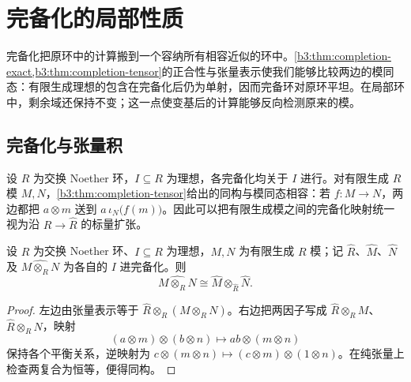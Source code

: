 
\section{完备化的局部性质}
\label{b3:sec:1304}


完备化把原环中的计算搬到一个容纳所有相容近似的环中。\cref{b3:thm:completion-exact,b3:thm:completion-tensor}的正合性与张量表示使我们能够比较两边的模同态：有限生成理想的包含在完备化后仍为单射，因而完备环对原环平坦。在局部环中，剩余域还保持不变；这一点使变基后的计算能够反向检测原来的模。

\subsection{完备化与张量积}
\label{b3:subsec:1304:01}

设 \(R\) 为交换 Noether 环，\(I\subseteq R\) 为理想，各完备化均关于 \(I\) 进行。对有限生成 \(R\) 模 \(M,N\)，\cref{b3:thm:completion-tensor}给出的同构与模同态相容：若 \(f:M\rightarrow N\)，两边都把 \(a\otimes m\) 送到 \(a\,\iota_N\bigl(f(m)\bigr)\)。因此可以把有限生成模之间的完备化映射统一视为沿 \(R\rightarrow\widehat R\) 的标量扩张。

\begin{proposition}\label{b3:prop:completion-finite-tensor-products}
	设 \(R\) 为交换 Noether 环、\(I\subseteq R\) 为理想，\(M,N\) 为有限生成 \(R\) 模；记 \(\widehat R\)、\(\widehat M\)、\(\widehat N\) 及 \(\widehat{M\otimes_RN}\) 为各自的 \(I\) 进完备化。则
	\[
		\widehat{M\otimes_RN} \cong\widehat M\otimes_{\widehat R}\widehat N.
	\]
\end{proposition}
\begin{proof}
	左边由张量表示等于 \(\widehat R\otimes_R(M\otimes_RN)\)。右边把两因子写成 \(\widehat R\otimes_RM\)、\(\widehat R\otimes_RN\)，映射
	\[
		(a\otimes m)\otimes(b\otimes n)\longmapsto ab\otimes(m\otimes n)
	\]
	保持各个平衡关系，逆映射为 \(c\otimes(m\otimes n)\mapsto(c\otimes m)\otimes(1\otimes n)\)。在纯张量上检查两复合为恒等，便得同构。
\end{proof}

